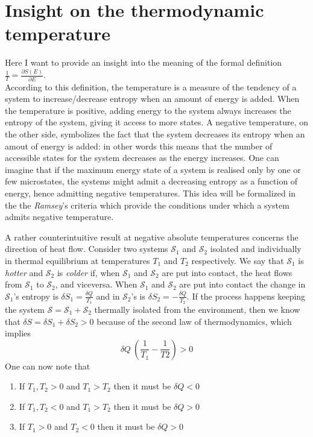 \section{Insight on the thermodynamic temperature}
Here I want to provide an insight into the meaning of the formal definition $\frac{1}{T} = \frac{\partial S(E)}{\partial E}$. \\
According to this definition, the temperature is a measure of the tendency of a system to increase/decrease entropy when an amount of energy is added. When the temperature is positive, adding energy to the system always 
increases the entropy of the system, giving it access to more states. A negative temperature, on the other side, symbolizes the fact that the system decreases its entropy when an amout of energy is added: in other 
words this means that the number of accessible states for the system decreases as the energy increases. One can imagine that if the maximum energy state of a system is realised only by one or few microstates, the systems might admit a decreasing 
entropy as a function of energy, hence admitting negative temperatures. This idea will be formalized in the the \emph{Ramsey}'s criteria which provide the conditions under which a system admits negative temperature. \par
\vspace{15pt}
A rather counterintuitive result at negative absolute temperatures concerns the direction of heat flow. Consider two systems $\mathcal{S}_1$ and $\mathcal{S}_2$ isolated and individually in thermal equilibrium at temperatures $T_1$ and $T_2$ respectively. We say that $\mathcal{S}_1$ is \textit{hotter} and $\mathcal{S}_2$ is \textit{colder} if, when 
$\mathcal{S}_1$ and $\mathcal{S}_2$ are put into contact, the heat flows from $\mathcal{S}_1$ to $\mathcal{S}_2$, and viceversa. When $\mathcal{S}_1$ and $\mathcal{S}_2$ are put into contact the change in $\mathcal{S}_1$'s entropy is $\delta S_1 = \frac{\delta Q}{T_1}$ and in $\mathcal{S}_2$'s is $\delta S_2 = -\frac{\delta Q}{T_2}$. If the process happens keeping 
the system $\mathcal{S} = \mathcal{S}_1 + \mathcal{S}_2$ thermally isolated from the environment, then we know that $\delta S = \delta S_1 + \delta S_2 > 0$ because of the second law of thermodynamics, which implies 
\begin{equation*}
    \delta Q \ \left(\frac{1}{T_1} - \frac{1}{T2}\right) > 0
\end{equation*}
One can now note that
\begin{enumerate}
    \item If $T_1, T_2 > 0$ and $T_1 > T_2$ then it must be $\delta Q < 0$
    \item If $T_1, T_2 < 0$ and $T_1 > T_2$ then it must be $\delta Q > 0$
    \item If $T_1 > 0$ and $T_2 < 0$ then it must be $\delta Q > 0$
\end{enumerate}
